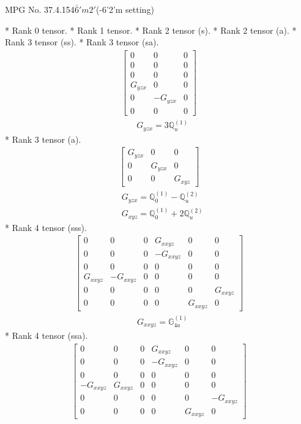 \documentclass[fleqn,8pt,landscape]{jsarticle}
\begin{document}
\setcounter{MaxMatrixCols}{32}

\renewcommand{\tablename}{Table~}
\renewcommand{\figurename}{Figure~}
\begin{center}
\LARGE
MPG No. 37.4.154\quad$\bar{6}'m2'$\quad(-6'2'm setting)
\end{center}
* Rank 0 tensor.
* Rank 1 tensor.
* Rank 2 tensor (s).
* Rank 2 tensor (a).
* Rank 3 tensor (ss).
* Rank 3 tensor (sa).
\begin{align*}
\begin{bmatrix} 0 & 0 & 0 \\ 0 & 0 & 0 \\ 0 & 0 & 0 \\ G_{yzx} & 0 & 0 \\ 0 & - G_{yzx} & 0 \\ 0 & 0 & 0 \end{bmatrix}
\end{align*}
\begin{align*}
& G_{yzx} = 3 \mathbb{Q}_{u}^{(1)}
\end{align*}
* Rank 3 tensor (a).
\begin{align*}
\begin{bmatrix} G_{yzx} & 0 & 0 \\ 0 & G_{yzx} & 0 \\ 0 & 0 & G_{xyz} \end{bmatrix}
\end{align*}
\begin{align*}
& G_{yzx} = \mathbb{Q}_{0}^{(1)} - \mathbb{Q}_{u}^{(2)} \\
& G_{xyz} = \mathbb{Q}_{0}^{(1)} + 2 \mathbb{Q}_{u}^{(2)}
\end{align*}
* Rank 4 tensor (sss).
\begin{align*}
\begin{bmatrix} 0 & 0 & 0 & G_{xxyz} & 0 & 0 \\ 0 & 0 & 0 & - G_{xxyz} & 0 & 0 \\ 0 & 0 & 0 & 0 & 0 & 0 \\ G_{xxyz} & - G_{xxyz} & 0 & 0 & 0 & 0 \\ 0 & 0 & 0 & 0 & 0 & G_{xxyz} \\ 0 & 0 & 0 & 0 & G_{xxyz} & 0 \end{bmatrix}
\end{align*}
\begin{align*}
& G_{xxyz} = \mathbb{G}_{4a}^{(1)}
\end{align*}
* Rank 4 tensor (ssa).
\begin{align*}
\begin{bmatrix} 0 & 0 & 0 & G_{xxyz} & 0 & 0 \\ 0 & 0 & 0 & - G_{xxyz} & 0 & 0 \\ 0 & 0 & 0 & 0 & 0 & 0 \\ - G_{xxyz} & G_{xxyz} & 0 & 0 & 0 & 0 \\ 0 & 0 & 0 & 0 & 0 & - G_{xxyz} \\ 0 & 0 & 0 & 0 & G_{xxyz} & 0 \end{bmatrix}
\end{align*}
\end{document}
